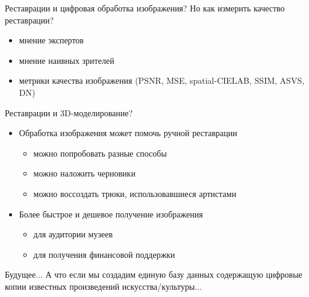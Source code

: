 \documentclass[13pt, t]{beamer}
\begin{document}
\begin{frame}{Реставрации и цифровая обработка изображения?}
Но как измерить качество реставрации?\\
\begin{itemize}
\item мнение экспертов
\item мнение наивных зрителей
\item метрики качества изображения (PSNR, MSE, spatial-CIELAB, SSIM, ASVS, DN)
\end{itemize}
\end{frame}


\begin{frame}{Реставрации и 3D-моделирование?}
\begin{itemize}
\item Обработка изображения может помочь ручной реставрации
\begin{itemize}
\item можно попробовать разные способы
\item можно наложить черновики
\item можно воссоздать трюки, использовавшиеся артистами
\end{itemize}
\item Более быстрое и дешевое получение изображения
\begin{itemize}
\item для аудитории музеев
\item для получения финансовой поддержки
\end{itemize}
\end{itemize}
\end{frame}

\begin{frame}{Будущее...}
А что если мы создадим единую базу данных содержащую цифровые копии известных произведений искусства/культуры...
\end{frame}

\end{document}
